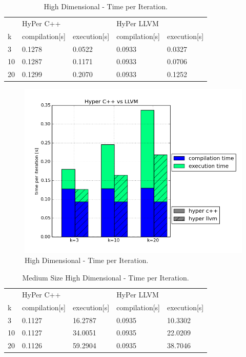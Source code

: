 \begin{table}[htsb]
  \caption[High Dimensional - Time per Iteration]{High Dimensional - Time per Iteration.}\label{tab:hd_serial}
  \centering
  \begin{tabular}{l l l l l}
    \toprule
      & HyPer C++ & & HyPer LLVM & \\
      k & compilation[s] & execution[s] & compilation[s] & execution[s] \\
    \midrule
      3  & 0.1278 & 0.0522 & 0.0933 & 0.0327 \\
      10 & 0.1287 & 0.1171 & 0.0933 & 0.0706 \\
      20 & 0.1299 & 0.2070 & 0.0933 & 0.1252 \\
    \bottomrule
  \end{tabular}
\end{table}


\begin{figure}[htsb]
  \centering
  \includegraphics[scale=0.4, trim="0cm 1.5cm 0cm 0cm"]{figures/charts/hyper_50000}
  \caption[High Dimensional - Time per Iteration]{High Dimensional - Time per Iteration.}
  \label{fig:hyper_50000}
\end{figure}



\begin{table}[htsb]
  \caption[Medium Size High Dimensional - Time per Iteration]{Medium Size High Dimensional - Time per Iteration.}
  \label{tab:med_hd_serial}
  \centering
  \begin{tabular}{l l l l l}
    \toprule
      & HyPer C++ & & HyPer LLVM & \\
      k & compilation[s] & execution[s] & compilation[s] & execution[s] \\
    \midrule
      3  & 0.1127 & 16.2787 & 0.0935 & 10.3302 \\
      10 & 0.1127 & 34.0051 & 0.0935 & 22.0209 \\
      20 & 0.1126 & 59.2904 & 0.0935 & 38.7046 \\
    \bottomrule
  \end{tabular}
\end{table}

